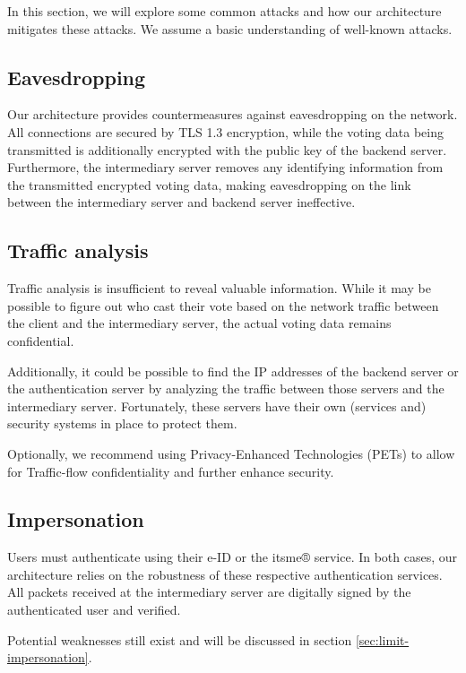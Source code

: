 \documentclass[a4paper,12pt,english]{article}
\begin{document}
In this section, we will explore some common attacks and how our architecture mitigates these attacks. We assume a basic understanding of well-known attacks.

\subsection{Eavesdropping}\label{sec:attack-eavesdropping}

Our architecture provides countermeasures against eavesdropping on the network. All connections are secured by TLS 1.3 encryption, while the voting data being transmitted is additionally encrypted with the public key of the backend server. Furthermore, the intermediary server removes any identifying information from the transmitted encrypted voting data, making eavesdropping on the link between the intermediary server and backend server ineffective.

\subsection{Traffic analysis}\label{sec:attack-traffic}

Traffic analysis is insufficient to reveal valuable information. While it may be possible to figure out who cast their vote based on the network traffic between the client and the intermediary server, the actual voting data remains confidential.

Additionally, it could be possible to find the IP addresses of the backend server or the authentication server by analyzing the traffic between those servers and the intermediary server. Fortunately, these servers have their own (services and) security systems in place to protect them.

Optionally, we recommend using Privacy-Enhanced Technologies (PETs) to allow for Traffic-flow confidentiality and further enhance security.

\subsection{Impersonation}\label{sec:attack-impersonation}

Users must authenticate using their e-ID or the itsme® service. In both cases, our architecture relies on the robustness of these respective authentication services. All packets received at the intermediary server are digitally signed by the authenticated user and verified.

Potential weaknesses still exist and will be discussed in section \ref{sec:limit-impersonation}.
\end{document}
